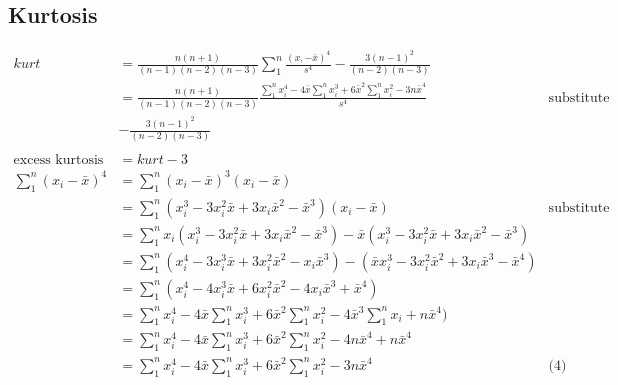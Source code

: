 \documentclass[11pt]{article} %
\begin{document}
\subsection{Kurtosis}
\begin{align*}
kurt &= \frac{n(n+1)}{(n-1)(n-2)(n-3)}\sum_1^n\frac{(x,-\bar{x})^4}{s^4} - \frac{3(n-1)^2}{(n-2)(n-3)}\\
      &= \frac{n(n+1)}{(n-1)(n-2)(n-3)}\frac{\sum_1^n  x_i^4 - 4\bar{x}\sum_1^n x_i^3 + 6\bar{x}^2\sum_1^n x_i^2-  3n\bar{x}^4}{s^4} & \text{substitute (4)}\\
      & - \frac{3(n-1)^2}{(n-2)(n-3)} \\
\\
\text{excess\ kurtosis} &= kurt -3 
\\
\sum_1^n {(x_i - \bar{x})^4} &= \sum_1^n  (x_i - \bar{x})^3(x_i - \bar{x}) \\
&=  \sum_1^n  (x_i^3 - 3x_i^2\bar{x} + 3x_i\bar{x}^2 - \bar{x}^3)(x_i - \bar{x}) & \text{substitute (2)} \\
&= \sum_1^n  x_i(x_i^3 - 3x_i^2\bar{x} + 3x_i\bar{x}^2 - \bar{x}^3) - \bar{x}(x_i^3 - 3x_i^2\bar{x} + 3x_i\bar{x}^2 - \bar{x}^3) \\
&= \sum_1^n  (x_i^4 - 3x_i^3\bar{x} + 3x_i^2\bar{x}^2 -  x_i\bar{x}^3) - (\bar{x}x_i^3 - 3x_i^2\bar{x}^2 + 3x_i\bar{x}^3 - \bar{x}^4) \\
&= \sum_1^n  (x_i^4 - 4x_i^3\bar{x} + 6x_i^2\bar{x}^2 -  4x_i\bar{x}^3 + \bar{x}^4) \\
&= \sum_1^n  x_i^4 - 4\bar{x}\sum_1^n x_i^3 + 6\bar{x}^2\sum_1^n x_i^2-  4\bar{x}^3 \sum_1^n x_i + n\bar{x}^4) \\
&= \sum_1^n  x_i^4 - 4\bar{x}\sum_1^n x_i^3 + 6\bar{x}^2\sum_1^n x_i^2-  4n\bar{x}^4 + n\bar{x}^4 \\
&= \sum_1^n  x_i^4 - 4\bar{x}\sum_1^n x_i^3 + 6\bar{x}^2\sum_1^n x_i^2-  3n\bar{x}^4 & \text{(4)}\\
\end{align*}
\end{document}
